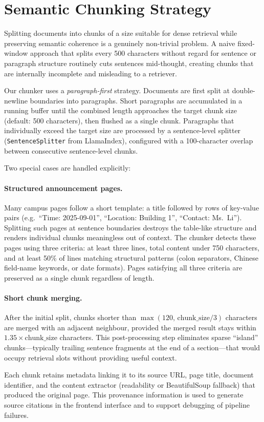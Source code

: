 \section{Semantic Chunking Strategy}

Splitting documents into chunks of a size suitable for dense retrieval while preserving semantic coherence is a genuinely non-trivial problem. A naive fixed-window approach that splits every 500 characters without regard for sentence or paragraph structure routinely cuts sentences mid-thought, creating chunks that are internally incomplete and misleading to a retriever.

Our chunker uses a \emph{paragraph-first} strategy. Documents are first split at double-newline boundaries into paragraphs. Short paragraphs are accumulated in a running buffer until the combined length approaches the target chunk size (default: 500 characters), then flushed as a single chunk. Paragraphs that individually exceed the target size are processed by a sentence-level splitter (\texttt{SentenceSplitter} from LlamaIndex), configured with a 100-character overlap between consecutive sentence-level chunks.

Two special cases are handled explicitly:

\paragraph{Structured announcement pages.} Many campus pages follow a short template: a title followed by rows of key-value pairs (e.g.\ ``Time: 2025-09-01'', ``Location: Building 1'', ``Contact: Ms.\ Li''). Splitting such pages at sentence boundaries destroys the table-like structure and renders individual chunks meaningless out of context. The chunker detects these pages using three criteria: at least three lines, total content under 750 characters, and at least 50\% of lines matching structural patterns (colon separators, Chinese field-name keywords, or date formats). Pages satisfying all three criteria are preserved as a single chunk regardless of length.

\paragraph{Short chunk merging.} After the initial split, chunks shorter than $\max(120,\, \text{chunk\_size}/3)$ characters are merged with an adjacent neighbour, provided the merged result stays within $1.35\times\text{chunk\_size}$ characters. This post-processing step eliminates sparse ``island'' chunks---typically trailing sentence fragments at the end of a section---that would occupy retrieval slots without providing useful context.

Each chunk retains metadata linking it to its source URL, page title, document identifier, and the content extractor (readability or BeautifulSoup fallback) that produced the original page. This provenance information is used to generate source citations in the frontend interface and to support debugging of pipeline failures.
